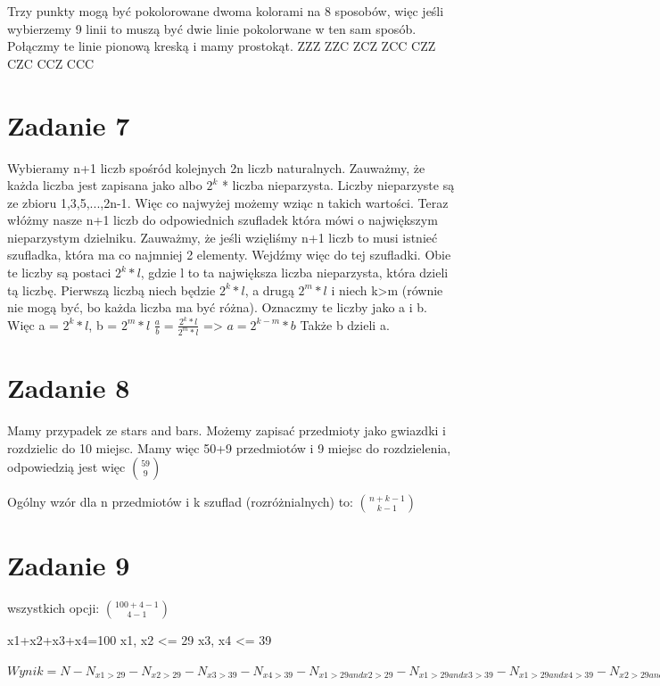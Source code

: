 \documentclass[12pt]{article}
\begin{document}
Trzy punkty mogą być pokolorowane dwoma kolorami na 8 sposobów, więc jeśli wybierzemy 9 linii to muszą być dwie linie pokolorwane w ten sam sposób. Połączmy te linie pionową kreską i mamy prostokąt. 
ZZZ
ZZC
ZCZ 
ZCC 
CZZ
CZC 
CCZ 
CCC
\section{Zadanie 7}
Wybieramy n+1 liczb spośród kolejnych 2n liczb naturalnych.
Zauważmy, że każda liczba jest zapisana jako albo $2^k$ * liczba nieparzysta. Liczby nieparzyste są ze zbioru {1,3,5,...,2n-1}. Więc co najwyżej możemy wziąc n takich wartości. 
Teraz włóżmy nasze n+1 liczb do odpowiednich szufladek która mówi o największym nieparzystym dzielniku. Zauważmy, że jeśli wzięliśmy n+1 liczb to musi istnieć szufladka, która ma co najmniej 2 elementy.
Wejdźmy więc do tej szufladki. Obie te liczby są postaci $2^k * l$, gdzie l to ta największa liczba nieparzysta, która dzieli tą liczbę.
Pierwszą liczbą niech będzie $2^k * l$, a drugą $2^m * l$ i niech k>m (równie nie mogą być, bo każda liczba ma być różna).
Oznaczmy te liczby jako a i b.
Więc 
a = $2^k * l$, 
b = $2^m * l$ 
$\frac{a}{b} = \frac{2^k * l}{2^m * l}$ => $a = 2^{k-m} * b$
Także b dzieli a. 

\section{Zadanie 8}
Mamy przypadek ze stars and bars. Możemy zapisać przedmioty jako gwiazdki i rozdzielic do 10 miejsc.
Mamy więc 50+9 przedmiotów i 9 miejsc do rozdzielenia, odpowiedzią jest więc
$\binom{59}{9}$

Ogólny wzór dla n przedmiotów i k szuflad (rozróżnialnych) to:
$\binom{n+k-1}{k-1}$



\section{Zadanie 9}


wszystkich opcji: $\binom{100+4-1}{4-1}$

x1+x2+x3+x4=100
x1, x2 <= 29
x3, x4 <= 39

$Wynik = N - N_{x1>29} - N_{x2>29} - N_{x3>39} - N_{x4>39} - N_{x1>29 and x2>29} - N_{x1>29 and x3>39} - N_{x1>29 and x4>39} - N_{x2>29 and x3>39} - N_{x2>29 and x4>39} - N_{x3>39 and x4>39} - N_{x1>29 and x2>29 and x3>39} - N_{x1 > 29 and x2>29 and x4>39} - N_{x1 > 29 and x3>39 and x4>39} - N_{x2 > 29 and x3>39 and x4>39} + N_{x1>29 and x2>29 and x3>39 and x4>39}$
\end{document}

